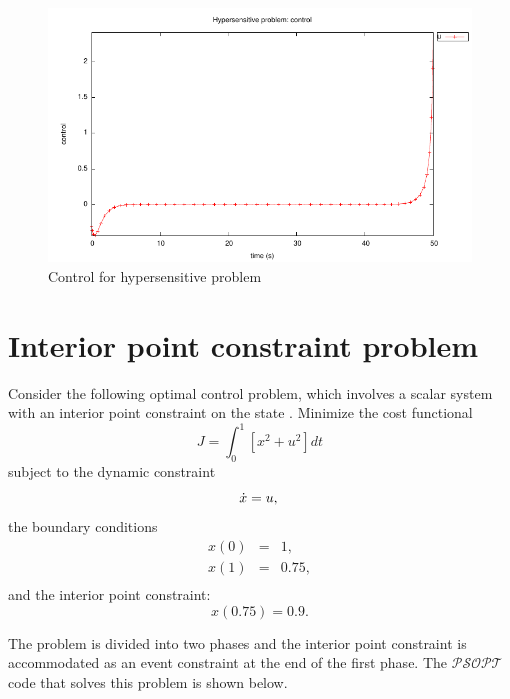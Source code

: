 \documentclass[a4paper,11pt]{report}    %
\newcommand{\psopt}{$\mathcal{PSOPT}$\,}  %
\begin{document}
\begin{figure}
  \centering
  \includegraphics{../examples/hyper/hyper_control}
  \caption{Control for hypersensitive problem}
\end{figure}



\section{Interior point constraint problem}

Consider the following optimal control problem, which involves a scalar system with an interior
point constraint on the state \cite{Jennings:02}.  Minimize the cost functional
\begin{equation}
  J =  \int_0^{1} [ x^2 + u^2 ] dt
\end{equation}
subject to the dynamic constraint
\begin{equation}
    \dot x  =   u, \\
\end{equation}
the boundary conditions
\begin{equation}
  \begin{array}{lcl}
    x(0) & = & 1, \\
    x(1) & = & 0.75, \\
  \end{array}
\end{equation}
and the interior point constraint:
\begin{equation}
  x(0.75) = 0.9.
\end{equation}

The problem is divided into two phases and the interior point constraint is accommodated as an event constraint at the end of the first phase. The
\psopt code that solves this problem is shown below.  
\end{document}
